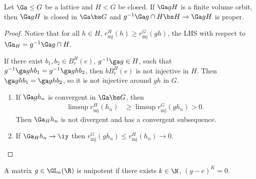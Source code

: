 \begin{pr}
Let $\Ga\le G$ be a lattice and $H<G$ be closed. If $\Ga gH$ is a finite volume orbit, then $\Ga gH$ is closed in $\Ga\bs G$ and 
$g^{-1}\Ga g\cap H\bs H\to \Ga g H$ is proper.
\end{pr}
\begin{proof}
Notice that for all $h\in H$, $r_{\text{inj}}^H(h) \ge r_{\text{inj}}^G (gh)$, the LHS with respect to $\Ga_H = g^{-1}\Ga g\cap H$.

If there exist $b_1,b_2\in B_r^H(e)$, $g^{-1}\ga g\in H$, such that 
$g^{-1}\ga g h b_1 = g^{-1} \ga g h b_2$, then $bB_r^{H}(e)$ is not injective in $H$. Then $\ga g h b_1 = \ga g h b_2$, so it is not injective around $gh$ in $G$. 
\begin{enumerate}
\item
If $\Ga gh_n$ is convergent in $\Ga \bs G$, then
\begin{align}
\limsup r_{\text{inj}}^H(h_n) 
&\ge
\limsup r_{\text{inj}}^G (gh_n)>0.
\end{align}
Then $\Ga_H h_n$ is not divergent and has a convergent subsequence. 
\item
If $\Ga_H h_n\to \iy$ then $r_{\text{inj}}^G(gh_n) \le r_{\text{inj}}^H(h_n)\to 0$. 
\end{enumerate}
\end{proof}
\begin{df}
A matrix $g\in \GL_n(\R)$ is unipotent if there exists $k\in \N$, $(g-e)^K=0$. 
\end{df}

